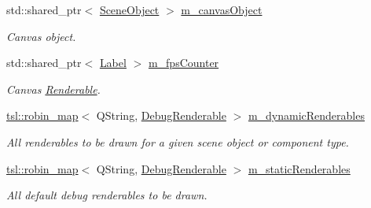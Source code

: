 \begin{Indent}
\begin{DoxyCompactItemize}
\mbox{\label{classrev_1_1_debug_manager_a9e8ffe048c05dbaf7e948e89f4a5b40d}} 
std\+::shared\+\_\+ptr$<$ \mbox{\hyperlink{classrev_1_1_scene_object}{Scene\+Object}} $>$ \mbox{\hyperlink{classrev_1_1_debug_manager_a9e8ffe048c05dbaf7e948e89f4a5b40d}{m\+\_\+canvas\+Object}}
\begin{DoxyCompactList}\small\item\em Canvas object. \end{DoxyCompactList}\item 
\mbox{\label{classrev_1_1_debug_manager_a2342abe017d88a47891c435ef6d8a05d}} 
std\+::shared\+\_\+ptr$<$ \mbox{\hyperlink{classrev_1_1_label}{Label}} $>$ \mbox{\hyperlink{classrev_1_1_debug_manager_a2342abe017d88a47891c435ef6d8a05d}{m\+\_\+fps\+Counter}}
\begin{DoxyCompactList}\small\item\em Canvas \mbox{\hyperlink{classrev_1_1_renderable}{Renderable}}. \end{DoxyCompactList}\item 
\mbox{\label{classrev_1_1_debug_manager_a1edb55deaffdbb6518183cc0d89602fb}} 
\mbox{\hyperlink{classtsl_1_1robin__map}{tsl\+::robin\+\_\+map}}$<$ Q\+String, \mbox{\hyperlink{structrev_1_1_debug_manager_1_1_debug_renderable}{Debug\+Renderable}} $>$ \mbox{\hyperlink{classrev_1_1_debug_manager_a1edb55deaffdbb6518183cc0d89602fb}{m\+\_\+dynamic\+Renderables}}
\begin{DoxyCompactList}\small\item\em All renderables to be drawn for a given scene object or component type. \end{DoxyCompactList}\item 
\mbox{\label{classrev_1_1_debug_manager_a48fdd2491807a10634812299b8658d06}} 
\mbox{\hyperlink{classtsl_1_1robin__map}{tsl\+::robin\+\_\+map}}$<$ Q\+String, \mbox{\hyperlink{structrev_1_1_debug_manager_1_1_debug_renderable}{Debug\+Renderable}} $>$ \mbox{\hyperlink{classrev_1_1_debug_manager_a48fdd2491807a10634812299b8658d06}{m\+\_\+static\+Renderables}}
\begin{DoxyCompactList}\small\item\em All default debug renderables to be drawn. \end{DoxyCompactList}\item 

\end{DoxyCompactItemize}
\end{Indent}
